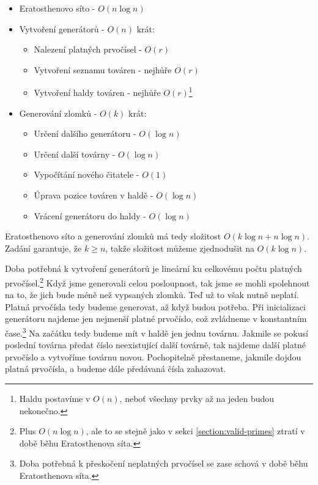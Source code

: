 \documentclass{article}
\begin{document}
\begin{itemize}
    \item Eratosthenovo síto - $O\left(n\log{n}\right)$
    \item Vytvoření generátorů - $O\left(n\right)$ krát:
          \begin{itemize}
              \item Nalezení platných prvočísel - $O\left(r\right)$
              \item Vytvoření seznamu továren - nejhůře $O\left(r\right)$
              \item Vytvoření haldy továren - nejhůře $O\left(r\right)$\footnote{Haldu postavíme v $O\left(n\right)$, neboť všechny prvky až na jeden budou nekonečno.}
          \end{itemize}
    \item Generování zlomků - $O\left(k\right)$ krát:
          \begin{itemize}
              \item Určení dalšího generátoru - $O\left(\log{n}\right)$
              \item Určení další továrny - $O\left(\log{n}\right)$
              \item Vypočítání nového čitatele - $O\left(1\right)$
              \item Úprava pozice továren v haldě - $O\left(\log{n}\right)$
              \item Vrácení generátoru do haldy - $O\left(\log{n}\right)$
          \end{itemize}
\end{itemize}

Eratosthenovo síto a generování zlomků má tedy složitost $O\left(k\log{n} + n\log{n}\right)$. Zadání garantuje, že $k \geq n$, takže složitost můžeme zjednodušit na $O\left(k\log{n}\right)$.

Doba potřebná k vytvoření generátorů je lineární ku celkovému počtu platných prvočísel.\footnote{Plus $O\left(n\log{n}\right)$, ale to se stejně jako v sekci \ref{section:valid-primes} ztratí v době běhu Eratosthenova síta.} Když jsme generovali celou posloupnost, tak jsme se mohli spolehnout na to, že jich bude méně než vypsaných zlomků. Teď už to však nutně neplatí. Platná prvočísla tedy budeme generovat, až když budou potřeba. Při inicializaci generátoru najdeme jen nejmenší platné prvočíslo, což zvládneme v konstantním čase.\footnote{Doba potřebná k přeskočení neplatných prvočísel se zase schová v době běhu Eratosthenova síta.} Na začátku tedy budeme mít v haldě jen jednu továrnu. Jakmile se pokusí poslední továrna předat číslo neexistující další továrně, tak najdeme další platné prvočíslo a vytvoříme továrnu novou. Pochopitelně přestaneme, jakmile dojdou platná prvočísla, a budeme dále předávaná čísla zahazovat.
\end{document}
